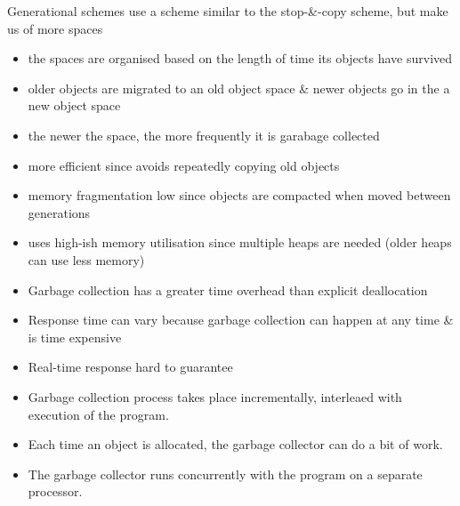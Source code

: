 Generational schemes use a scheme similar to the stop-\&-copy scheme, but make us of more 
spaces
\begin{itemize}
    \item the spaces are organised based on the length of time its objects have survived
    \item older objects are migrated to an old object space \& newer objects go in the a 
    new object space
    \item the newer the space, the more frequently it is garabage collected
    \item more efficient since avoids repeatedly copying old objects
    \item memory fragmentation low since objects are compacted when moved between generations
    \item uses high-ish memory utilisation since multiple heaps are needed (older heaps can use less memory)
\end{itemize}

\begin{itemize}
    \item Garbage collection has a greater time overhead than explicit deallocation
    \item Response time can vary because garbage collection can happen at any time 
    \& is time expensive
    \item Real-time response hard to guarantee
\end{itemize}

\begin{itemize}
    \item Garbage collection process takes place incrementally, interleaed with 
    execution of the program.
    \item Each time an object is allocated, the garbage collector can do a bit 
    of work.
\end{itemize}

\begin{itemize}
    \item The garbage collector runs concurrently with the program on a separate 
    processor.
\end{itemize}